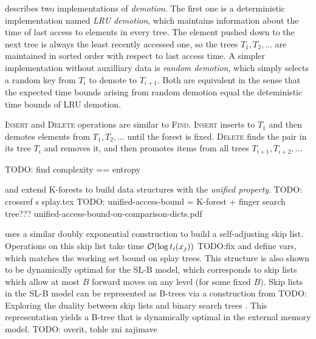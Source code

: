 \cite{martel} describes two implementations of \emph{demotion}.
The first one is a deterministic implementation named \emph{LRU demotion},
which maintains information about the time of last access to elements
in every tree. The element pushed down to the next tree is always the least
recently accessed one, so the trees $T_1,T_2,\ldots$ are maintained in sorted
order with respect to last access time.
A simpler implementation without auxilliary data is \emph{random demotion},
which simply selects a random key from $T_i$ to demote to $T_{i+1}$.
Both are equivalent in the sense that the expected time bounds arising
from random demotion equal the deteministic time bounds of LRU demotion.

\textsc{Insert} and \textsc{Delete} operations are similar to \textsc{Find}.
\textsc{Insert} inserts to $T_1$ and then demotes elements from $T_1,T_2,\ldots$
until the forest is fixed.
\textsc{Delete} finds the pair in its tree $T_i$ and removes it, and
then promotes items from all trees $T_{i+1},T_{i+2},\ldots$

TODO: find complexity == entropy

\cite{alternatives-to-splay-trees} and \cite{unified-access-bound} extend
K-forests to build data structures with the \emph{unified property}.
TODO: crossref s splay.tex
TODO: unified-access-bound = K-forest + finger search tree???
unified-access-bound-on-comparison-dicts.pdf

\cite{dynamic-optimality-for-sl} uses a similar doubly exponential construction
to build a self-adjusting skip list. Operations on this skip list take time
$\mathcal{O}(\log t_i(x_j))$ TODO:fix and define vars, which matches the working set
bound on splay trees. This structure is also shown to be dynamically optimal
for the SL-B model, which corresponds to skip lists which allow at most
$B$ forward moves on any level (for some fixed $B$). Skip lists in the
SL-B model can be represented as B-trees via a construction from
TODO: Exploring the duality between skip lists and binary search trees
. This representation yields a B-tree that is dynamically optimal
in the external memory model.
TODO: overit, tohle zni zajimave
